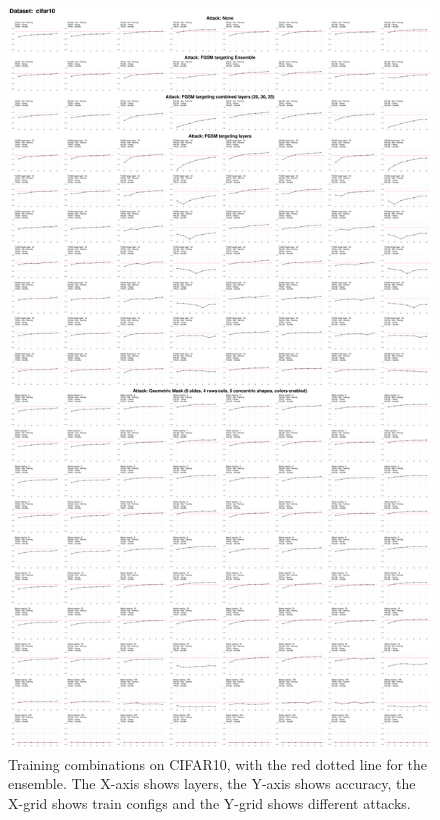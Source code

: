 \documentclass[a4paper, oneside]{discothesis}
\begin{document}
\begin{figure}
	\centering
	\includegraphics[width=\textwidth,height=\textheight,keepaspectratio]{figures/self_ensemble_8train_cifar10.pdf}
	\caption{Training combinations on CIFAR10, with the red dotted line for the ensemble. The X-axis shows layers, the Y-axis shows accuracy, the X-grid shows train configs and the Y-grid shows different attacks.}
	\label{fig:8train-cifar10}
\end{figure}
\end{document}
